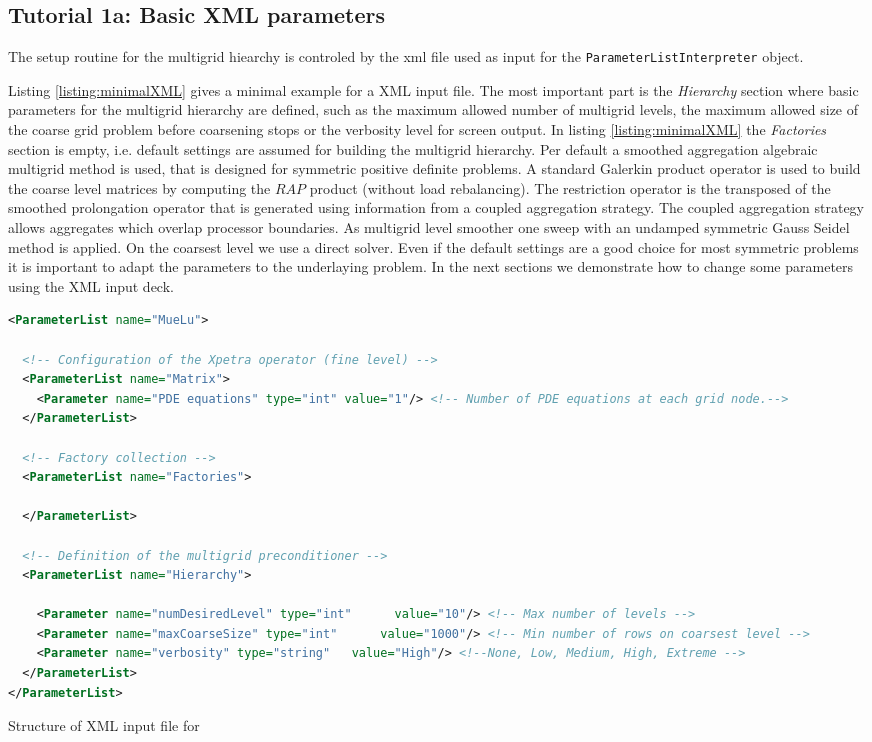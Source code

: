 \subsection{Tutorial 1a: Basic XML parameters}
The setup routine for the multigrid hiearchy is controled by the xml file used as input for the \verb|ParameterListInterpreter| object.

Listing \ref{listing:minimalXML} gives a minimal example for a \MueLu XML input file. The most important part is the \textit{Hierarchy} section where basic parameters for the multigrid hierarchy are defined, such as the maximum allowed number of multigrid levels, the maximum allowed size of the coarse grid problem before coarsening stops or the verbosity level for screen output. In listing \ref{listing:minimalXML} the \textit{Factories} section is empty, i.e. default settings are assumed for building the multigrid hierarchy.
Per default a smoothed aggregation algebraic multigrid method is used, that is designed for symmetric positive definite problems. A standard Galerkin product operator is used to build the coarse level matrices by computing the $RAP$ product (without load rebalancing). The restriction operator is the transposed of the smoothed prolongation operator that is generated using information from a coupled aggregation strategy. The coupled aggregation strategy allows aggregates which overlap processor boundaries. As multigrid level smoother one sweep with an undamped symmetric Gauss Seidel method is applied. On the coarsest level we use a direct solver.
Even if the default settings are a good choice for most symmetric problems it is important to adapt the parameters to the underlaying problem. In the next sections we demonstrate how to change some parameters using the XML input deck.
\begin{Listing} 
\begin{center} 
\begin{lstlisting}[language=XML,label=listing:minimalXML]
<ParameterList name="MueLu">

  <!-- Configuration of the Xpetra operator (fine level) -->
  <ParameterList name="Matrix">
    <Parameter name="PDE equations" type="int" value="1"/> <!-- Number of PDE equations at each grid node.-->
  </ParameterList>

  <!-- Factory collection -->
  <ParameterList name="Factories">

  </ParameterList>

  <!-- Definition of the multigrid preconditioner -->
  <ParameterList name="Hierarchy">

    <Parameter name="numDesiredLevel" type="int"      value="10"/> <!-- Max number of levels -->
    <Parameter name="maxCoarseSize" type="int"      value="1000"/> <!-- Min number of rows on coarsest level -->
    <Parameter name="verbosity" type="string"   value="High"/> <!--None, Low, Medium, High, Extreme -->
  </ParameterList>
</ParameterList>

\end{lstlisting}
\caption{Structure of XML input file for \MueLu} 
\label{listing:minimalXML}
\end{center}
\end{Listing}

